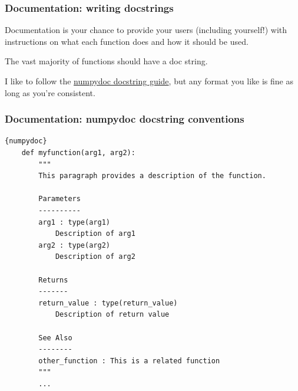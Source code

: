 \documentclass[10pt]{beamer}
\begin{document}
  \begin{frame} \frametitle{Documentation: writing docstrings}

    Documentation is your chance to provide your users (including yourself!) with instructions
    on what each function does and how it should be used.

    \vspace{0.25cm}

    The vast majority of functions should have a doc string.

    \vspace{0.25cm}

    I like to follow the
    \href{https://numpydoc.readthedocs.io/en/latest/format.html}{numpydoc docstring guide},
    but any format you like is fine as long as you're consistent.

  \end{frame}

  \begin{frame}[fragile] \frametitle{Documentation: numpydoc docstring conventions}

    \begin{lstlisting}{numpydoc}
    def myfunction(arg1, arg2):
        """
        This paragraph provides a description of the function.

        Parameters
        ----------
        arg1 : type(arg1)
            Description of arg1
        arg2 : type(arg2)
            Description of arg2

        Returns
        -------
        return_value : type(return_value)
            Description of return value

        See Also
        --------
        other_function : This is a related function
        """
        ...
    \end{lstlisting}

  \end{frame}
\end{document}
